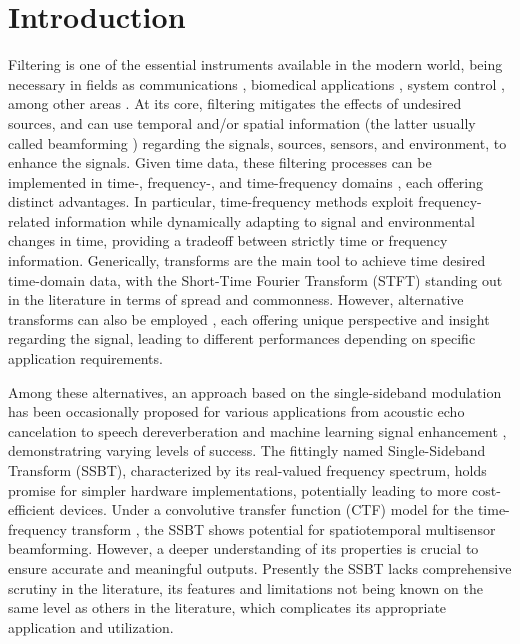 \section{Introduction}
\label{sec:introduction}


Filtering is one of the essential instruments available in the modern world, being necessary in fields as communications \cite{chen_source_2002}, biomedical applications \cite{lobato_worst-case-optimization_2020,lu_biomedical_1994,nguyen_minimum_2017}, system control \cite{han_comparative_2016, hagglund_signal_2012}, among other areas \cite{hathcock_noise_2016,lee_general_2002,shi_new_2004}. At its core, filtering mitigates the effects of undesired sources, and can use temporal and/or spatial information (the latter usually called beamforming \cite{dougherty_functional_2014}) regarding the signals, sources, sensors, and environment, to enhance the signals. Given time data, these filtering processes can be implemented in time-, frequency-, and time-frequency domains \cite{benesty_fundamentals_2017}, each offering distinct advantages. In particular, time-frequency methods exploit frequency-related information while dynamically adapting to signal and environmental changes in time, providing a tradeoff between strictly time or frequency information. Generically, transforms are the main tool to achieve time desired time-domain data, with the Short-Time Fourier Transform (STFT) \cite{kiymik_comparison_2005,pan_microphone_2021} standing out in the literature in terms of spread and commonness. However, alternative transforms can also be employed \cite{chen_wavelet-based_2018,yang_general_2014,almeida_fractional_1994}, each offering unique perspective and insight regarding the signal, leading to different performances depending on specific application requirements.


Among these alternatives, an approach based on the single-sideband modulation has been occasionally proposed  \cite{crochiere_multirate_1983} for various applications from acoustic echo cancelation \cite{chin_subband_2001} to speech dereverberation \cite{oyzerman_system_2012} and machine learning signal enhancement \cite{okamoto_subband_2017}, demonstratring varying levels of success. The fittingly named Single-Sideband Transform (SSBT), characterized by its real-valued frequency spectrum, holds promise for simpler hardware implementations, potentially leading to more cost-efficient devices. Under a convolutive transfer function (CTF) model for the time-frequency transform \cite{talmon_relative_2009}, the SSBT shows potential for spatiotemporal multisensor beamforming. However, a deeper understanding of its properties is crucial to ensure accurate and meaningful outputs. Presently the SSBT lacks comprehensive scrutiny in the literature, its features and limitations not being known on the same level as others in the literature, which complicates its appropriate application and utilization.

